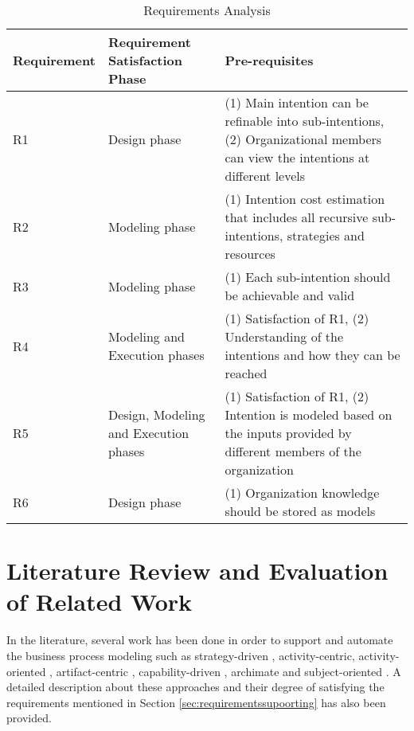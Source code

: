 \begin{table} [htbp]
	\centering
	\begin{tabular} {p{2.5cm}p{3cm}p{8cm}}
		\toprule
		\textbf{Requirement} & \textbf{Requirement Satisfaction Phase} & \textbf{Pre-requisites}    \\
		\midrule                                                                                                               
		R1    & Design phase    &(1) Main intention can be refinable into sub-intentions, (2) Organizational members can view the intentions at different levels    \\ 
		
		R2   & Modeling phase    &(1) Intention cost estimation that includes all recursive sub-intentions, strategies and resources \\         
			
		R3   & Modeling phase       &(1) Each sub-intention should  be achievable and valid \\      
		
		R4   & Modeling and Execution phases     &(1) Satisfaction of R1, (2) Understanding of the intentions and how they can be reached \\                         
			
		R5  &Design, Modeling and Execution phases  &(1) Satisfaction of R1, (2) Intention is modeled based on the inputs provided by different members of the organization               \\ 
		
		R6   & Design phase         &(1) Organization knowledge should be stored as models \\        
		
		\bottomrule
	\end{tabular}
	\caption{Requirements Analysis}
	\label{tab:subrequirements}
\end{table}

\section{Literature Review and Evaluation of Related Work}
\label{sec:literaturereview}
In the literature, several work has been done in order to support and automate the business process modeling such as strategy-driven \cite{bider2005strategy}, activity-centric\cite{Yarosh2009}, activity-oriented \cite{Reijers2006}, artifact-centric \cite{Cohn2009}, capability-driven \cite{Stirna2012}, archimate \cite{Aldea2015} and subject-oriented \cite{Fleischmann2013}.  A detailed description about these approaches and their degree of satisfying the requirements mentioned in Section \ref{sec:requirementssupoorting} has also been provided. 

